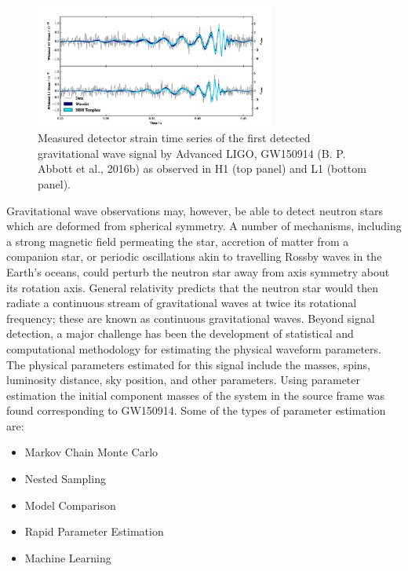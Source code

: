\begin{figure}[h!]
\centering
\includegraphics[height=0.7\textwidth, width=0.7\textwidth]{images/mass_estimation_graph.png}
\caption{\small Measured detector strain time series of the first detected gravitational wave signal by Advanced LIGO, GW150914 (B. P. Abbott et al., 2016b) as observed in H1 (top panel) and L1 (bottom panel).}
\end{figure}

Gravitational wave observations may, however, be able to detect neutron stars which are deformed from spherical symmetry. A number of mechanisms, including a strong magnetic field permeating the star, accretion of matter from a companion star, or periodic oscillations akin to travelling Rossby waves in the Earth’s oceans, could perturb the neutron star away from axis symmetry about its rotation axis. General relativity predicts that the neutron star would then radiate a continuous stream of gravitational waves at twice its rotational frequency; these are known as continuous gravitational waves. Beyond signal detection, a major challenge has been the development of statistical and computational methodology for estimating the physical waveform parameters.\\

The physical parameters estimated for this signal include the masses, spins, luminosity distance, sky position, and other parameters. Using parameter estimation the initial component masses of the system in the source frame was found corresponding to GW150914. Some of the types of parameter estimation are:

\begin{itemize}
    \item Markov Chain Monte Carlo
    \item Nested Sampling
    \item Model Comparison
    \item Rapid Parameter Estimation
    \item Machine Learning
\end{itemize}

